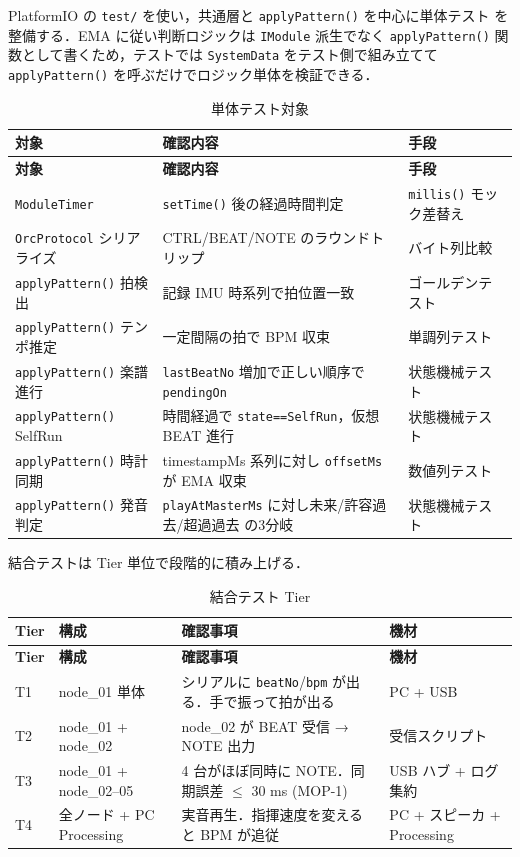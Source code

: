 \documentclass[lualatex,book,paper=a4paper,jafontsize=11.5pt,jafontscale=1.05]{jlreq}
\begin{document}
PlatformIO の \texttt{test/} を使い，共通層と \texttt{applyPattern()} を中心に単体テスト
を整備する．EMA に従い判断ロジックは \texttt{IModule} 派生でなく \texttt{applyPattern()}
関数として書くため，テストでは \texttt{SystemData} をテスト側で組み立てて
\texttt{applyPattern()} を呼ぶだけでロジック単体を検証できる．

\begin{longtable}{p{} p{} p{}}
\caption{単体テスト対象}\label{tab:unit-tests}\\
\toprule
\textbf{対象} & \textbf{確認内容} & \textbf{手段} \\
\midrule
\endfirsthead
\toprule
\textbf{対象} & \textbf{確認内容} & \textbf{手段} \\
\midrule
\endhead
\texttt{ModuleTimer}              & \texttt{setTime()} 後の経過時間判定 & \texttt{millis()} モック差替え \\
\texttt{OrcProtocol} シリアライズ & CTRL/BEAT/NOTE のラウンドトリップ   & バイト列比較 \\
\texttt{applyPattern()} 拍検出    & 記録 IMU 時系列で拍位置一致         & ゴールデンテスト \\
\texttt{applyPattern()} テンポ推定 & 一定間隔の拍で BPM 収束           & 単調列テスト \\
\texttt{applyPattern()} 楽譜進行  & \texttt{lastBeatNo} 増加で正しい順序で \texttt{pendingOn} & 状態機械テスト \\
\texttt{applyPattern()} SelfRun   & 時間経過で \texttt{state==SelfRun}，仮想 BEAT 進行 & 状態機械テスト \\
\texttt{applyPattern()} 時計同期  & timestampMs 系列に対し \texttt{offsetMs} が EMA 収束 & 数値列テスト \\
\texttt{applyPattern()} 発音判定  & \texttt{playAtMasterMs} に対し未来/許容過去/超過過去 の3分岐 & 状態機械テスト \\
\bottomrule
\end{longtable}

結合テストは Tier 単位で段階的に積み上げる．

\begin{longtable}{l p{} p{} p{}}
\caption{結合テスト Tier}\label{tab:integration-tier}\\
\toprule
\textbf{Tier} & \textbf{構成} & \textbf{確認事項} & \textbf{機材} \\
\midrule
\endfirsthead
\toprule
\textbf{Tier} & \textbf{構成} & \textbf{確認事項} & \textbf{機材} \\
\midrule
\endhead
T1 & node\_01 単体           & シリアルに \texttt{beatNo}/\texttt{bpm} が出る．手で振って拍が出る   & PC + USB \\
T2 & node\_01 + node\_02     & node\_02 が BEAT 受信 → NOTE 出力                                       & 受信スクリプト \\
T3 & node\_01 + node\_02--05 & 4 台がほぼ同時に NOTE．同期誤差 $\leq$ 30 ms (MOP-1)                   & USB ハブ + ログ集約 \\
T4 & 全ノード + PC Processing & 実音再生．指揮速度を変えると BPM が追従                                & PC + スピーカ + Processing \\
\bottomrule
\end{longtable}
\end{document}
